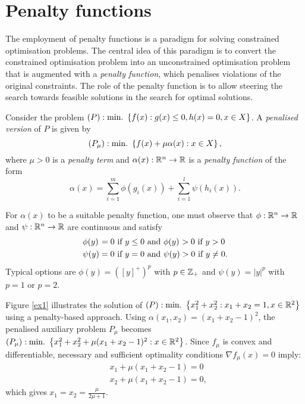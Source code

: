 
\section{Penalty functions}

The employment of penalty functions is a paradigm for solving constrained optimisation problems. The central idea of this paradigm is to convert the constrained optimisation problem into an unconstrained optimisation problem that is augmented with a \emph{penalty function}, which penalises violations of the original constraints. The role of the penalty function is to allow steering the search towards feasible solutions in the search for optimal solutions. 

Consider the problem $(P): \mathop{\text{min.~}}\left\{ f(x) : g(x) \leq 0, h(x) = 0, x \in X \right \}$. A \emph{penalised version} of $P$ is given by 
$$
(P_\mu) : \mathop{\text{min.~}}\left\{ f(x) + \mu\alpha(x) : x \in X \right \},
$$
where $\mu > 0$ is a \emph{penalty term} and $\alpha(x) : \mathbb{R}^n \to \mathbb{R}$ is a \emph{penalty function} of the form
%
\begin{equation} 
	\alpha(x) = \sum_{i=1}^m \phi(g_i(x)) + \sum_{i=1}^l\psi(h_i(x)). \label{eq:penalty_function}	
\end{equation}

For $\alpha(x)$ to be a suitable penalty function, one must observe that $\phi : \mathbb{R}^n \to \mathbb{R}$ and $\psi: \mathbb{R}^n \to \mathbb{R}$ are continuous and satisfy
%
\begin{align*}
	& \phi(y) \hspace{1.0pt}= 0 \text{ if } y \leq 0 \text{ and } \phi(y) \hspace{0.5pt}> 0 \text{ if } y > 0\\
	& \psi(y) = 0 \text{ if } y = 0 \text{ and } \psi(y) > 0 \text{ if } y \neq 0.
\end{align*}
%
Typical options are $\phi(y) = ([y]^+)^p$ with $p \in \mathbb{Z}_+$ and $\psi(y) = |y|^p$ with $p=1$ or $p=2$.

Figure \ref{ex1} illustrates the solution of $(P) : \mathop{\text{min.~}}\left\{ x_1^2 + x_2^2 : x_1 + x_2 = 1, x \in \mathbb{R}^2 \right \}$ using a penalty-based approach. Using $\alpha(x_1,x_2) = (x_1 + x_2 - 1)^2$, the penalised auxiliary problem $P_\mu$ becomes $(P_\mu) :\mathop{\text{min.~}}\left\{ x_1^2 + x_2^2 + \mu(x_1 + x_2 - 1)^2 : x \in \mathbb{R}^2 \right \}$. Since $f_{\mu}$ is convex and differentiable, necessary and sufficient optimality conditions $\nabla f_\mu(x) = 0$ imply:
%
\begin{align*}
& x_1 + \mu(x_1 + x_2 -1) = 0\\
& x_2 + \mu(x_1 + x_2- 1) = 0,
\end{align*}
which gives $x_1 = x_2 = \frac{\mu}{2\mu + 1}$. 

